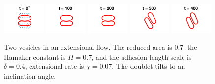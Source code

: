 \documentclass[prf,superscriptaddress,showpacs]{revtex4-1}
\begin{document}
\begin{figure}[htp]
  \includegraphics[width = 0.19\textwidth]{figs/extensional_adR4em1adS7em1Chi7em2_ra070_image01.png}
  \includegraphics[width = 0.19\textwidth]{figs/extensional_adR4em1adS7em1Chi7em2_ra070_image02.png}
  \includegraphics[width = 0.19\textwidth]{figs/extensional_adR4em1adS7em1Chi7em2_ra070_image03.png}
  \includegraphics[width = 0.19\textwidth]{figs/extensional_adR4em1adS7em1Chi7em2_ra070_image04.png}
  \includegraphics[width = 0.19\textwidth]{figs/extensional_adR4em1adS7em1Chi7em2_ra070_image05.png}
  \caption{\label{fig:extensional2} Two vesicles in an extensional flow.
  The reduced area is $0.7$, the Hamaker constant is $H = 0.7$, and the
  adhesion length scale is $\delta = 0.4$, extensional rate is $\chi =
  0.07$.  The doublet tilts to an inclination angle.}
\end{figure}
\end{document}
